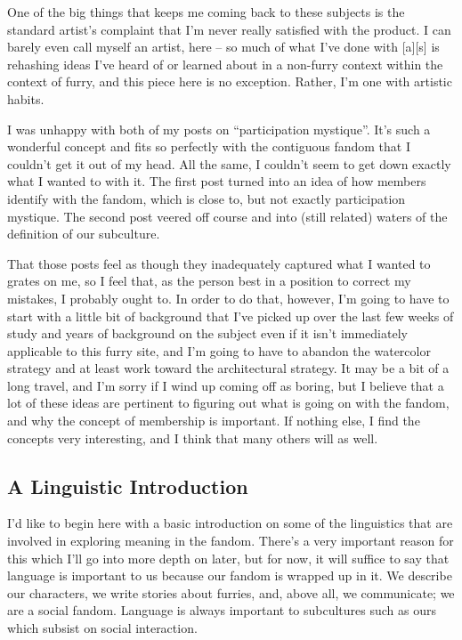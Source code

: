 One of the big things that keeps me coming back to these subjects is the standard artist's complaint that I'm never really satisfied with the product. I can barely even call myself an artist, here -- so much of what I've done with [a][s] is rehashing ideas I've heard of or learned about in a non-furry context within the context of furry, and this piece here is no exception. Rather, I'm one with artistic habits.

I was unhappy with both of my posts on ``participation mystique''. It's such a wonderful concept and fits so perfectly with the contiguous fandom that I couldn't get it out of my head. All the same, I couldn't seem to get down exactly what I wanted to with it. The first post turned into an idea of how members identify with the fandom, which is close to, but not exactly participation mystique. The second post veered off course and into (still related) waters of the definition of our subculture.

That those posts feel as though they inadequately captured what I wanted to grates on me, so I feel that, as the person best in a position to correct my mistakes, I probably ought to. In order to do that, however, I'm going to have to start with a little bit of background that I've picked up over the last few weeks of study and years of background on the subject even if it isn't immediately applicable to this furry site, and I'm going to have to abandon the watercolor strategy and at least work toward the architectural strategy. It may be a bit of a long travel, and I'm sorry if I wind up coming off as boring, but I believe that a lot of these ideas are pertinent to figuring out what is going on with the fandom, and why the concept of membership is important. If nothing else, I find the concepts very interesting, and I think that many others will as well.

\subsection*{A Linguistic Introduction}

I'd like to begin here with a basic introduction on some of the linguistics that are involved in exploring meaning in the fandom. There's a very important reason for this which I'll go into more depth on later, but for now, it will suffice to say that language is important to us because our fandom is wrapped up in it. We describe our characters, we write stories about furries, and, above all, we communicate; we are a social fandom. Language is always important to subcultures such as ours which subsist on social interaction.

